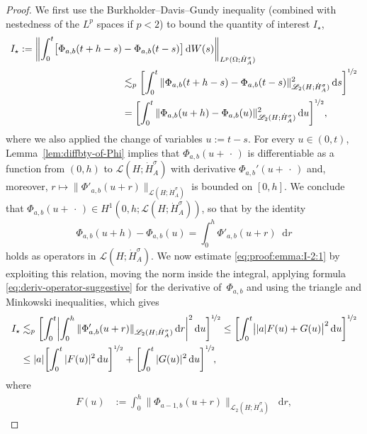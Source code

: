 \documentclass[reqno]{amsart}
\numberwithin{equation}{section}
\newcommand{\norm}[2]{     \| #1       \|_{ #2 }}
\newcommand{\rd}{\mathop{}\!\mathrm{d}}
\newcommand{\Hdot}[1]{\dot{H}^{#1}_A}
\theoremstyle{remark}
\theoremstyle{definition}
\begin{document}
\begin{proof}
	We first use the Burkholder--Davis--Gundy inequality 
	(combined with nestedness of the 
	$L^p$ spaces if $p<2$) 
	to bound the quantity of interest $I_\star$, 
	\begin{align}
	I_\star 
	:= 
	\biggl\| 
	\int_0^t \bigl[ \Phi_{a,b}(t+h-s) &- \Phi_{a,b}(t-s) \bigr] 
	\rd W(s) 
	\biggr\|_{L^p(\Omega;\dot H_A^\sigma)} 
	\notag 
	\\ 
	&\lesssim_p 
	\biggl[ 
	\int_0^t 
	\norm{ \Phi_{a,b}(t+h-s) - \Phi_{a,b}(t-s) }{\mathscr L_2(H;\dot H_A^\sigma)}^2 
	\rd s \biggr]^{\nicefrac{1}{2}} 
	\notag 
	\\ 
	&= 
	\biggl[ 
	\int_0^t 
	\norm{ \Phi_{a,b}(u+h) - \Phi_{a,b}(u) }{\mathscr L_2(H;\dot H_A^\sigma)}^2 
	\rd u \biggr]^{\nicefrac{1}{2}}, 
	\label{eq:proof:emma:I-2:1} 
	\end{align}
	where we also applied  
	the change of variables $u := t-s$. 
	For every $u \in (0,t)$, 
	Lemma~\ref{lem:diffbty-of-Phi} implies that
	$\Phi_{a,b}( u + \,\cdot\, )$ is differentiable as a function from 
	$(0,h)$ to $\mathscr L(H;\Hdot\sigma)$ with derivative 
	$\Phi_{a,b}'( u + \,\cdot\, )$ 
	and, moreover,
	$r \mapsto \norm{\Phi'_{a,b}(u+r)}{\mathscr L(H;\Hdot\sigma)}$ 
	is bounded on $[0,h]$. 
	We conclude that 
	$\Phi_{a,b}( u + \,\cdot\, ) \in H^1(0,h; \mathscr L(H;\Hdot\sigma))$,
	so that by \cite[\S5.9.2, Theorem~2]{Evans2010} 
	the identity 
	\[ 
	\Phi_{a,b}(u+h) - \Phi_{a,b}(u) 
	= 
	\int_0^h \Phi'_{a,b}(u+r) \rd r 
	\] 
	holds 
	as operators in $\mathscr L(H; \Hdot\sigma)$.
	We now estimate \eqref{eq:proof:emma:I-2:1} 
	by exploiting this relation, 
	moving the norm inside the integral,  
	applying formula \eqref{eq:deriv-operator-suggestive} 
	for the derivative of~$\Phi_{a,b}$ 
	and using the triangle and Minkowski inequalities, 
	which gives 
	\begin{align}
	I_\star 
	&\lesssim_p 
	\biggl[ 
	\int_0^t 
	\biggl|\int_0^h 
	\norm{\Phi_{a,b}'(u+r)}{\mathscr L_2(H;\dot H_A^\sigma)} 
	\rd r\biggr|^2 \rd u 
	\biggr]^{\nicefrac{1}{2}}
	\notag 
	\leq 
	\biggl[ \int_0^t \bigl| |a| F(u) + G(u) \bigr|^2 \rd u 
	\biggr]^{\nicefrac{1}{2}} 
	\\
	&\leq 
	|a| 
	\biggl[ \int_0^t |F(u)|^2 \rd u \biggr]^{\nicefrac{1}{2}} 
	+ 
	\biggl[ 
	\int_0^t |G(u)|^2 \rd u 
	\biggr]^{\nicefrac{1}{2}} \!, 
	\label{eq:proof:emma:I-2:2} 
	\end{align}
	where 
	\begin{align*} 
	F(u) 
	&:= 
	\int_0^h 
	\norm{\Phi_{a-1,b}(u+r)}{\mathscr L_2(H;\dot H_A^\sigma)} \rd r , 

\end{align*}
\end{proof}
\end{document}

